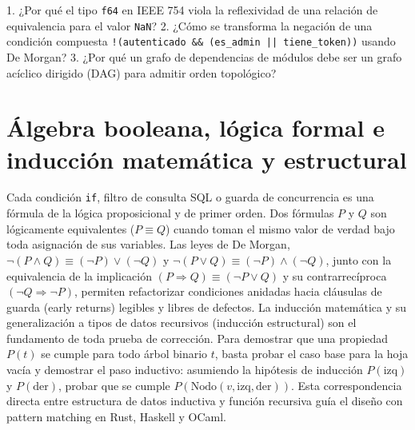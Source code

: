 \documentclass{book}
\begin{document}
\begin{tcolorbox}[title={Autoficha}, studiumcheck, breakable]

1. ¿Por qué el tipo \texttt{f64} en IEEE 754 viola la reflexividad de una relación de equivalencia para el valor \texttt{NaN}? 2. ¿Cómo se transforma la negación de una condición compuesta \texttt{!(autenticado \&\& (es\_admin || tiene\_token))} usando De Morgan? 3. ¿Por qué un grafo de dependencias de módulos debe ser un grafo acíclico dirigido (DAG) para admitir orden topológico?
\end{tcolorbox}

\section{Álgebra booleana, lógica formal e inducción matemática y estructural}

Cada condición \texttt{if}, filtro de consulta SQL o guarda de concurrencia es una fórmula de la lógica proposicional y de primer orden. Dos fórmulas \(P\) y \(Q\) son lógicamente equivalentes (\(P \equiv Q\)) cuando toman el mismo valor de verdad bajo toda asignación de sus variables. Las leyes de De Morgan, \(\neg(P \land Q) \equiv (\neg P) \lor (\neg Q)\) y \(\neg(P \lor Q) \equiv (\neg P) \land (\neg Q)\), junto con la equivalencia de la implicación \((P \Rightarrow Q) \equiv (\neg P \lor Q)\) y su contrarrecíproca \((\neg Q \Rightarrow \neg P)\), permiten refactorizar condiciones anidadas hacia cláusulas de guarda (early returns) legibles y libres de defectos.
La inducción matemática y su generalización a tipos de datos recursivos (inducción estructural) son el fundamento de toda prueba de corrección. Para demostrar que una propiedad \(P(t)\) se cumple para todo árbol binario \(t\), basta probar el caso base para la hoja vacía y demostrar el paso inductivo: asumiendo la hipótesis de inducción \(P(\text{izq})\) y \(P(\text{der})\), probar que se cumple \(P(\text{Nodo}(v, \text{izq}, \text{der}))\). Esta correspondencia directa entre estructura de datos inductiva y función recursiva guía el diseño con pattern matching en Rust, Haskell y OCaml.
\end{document}
